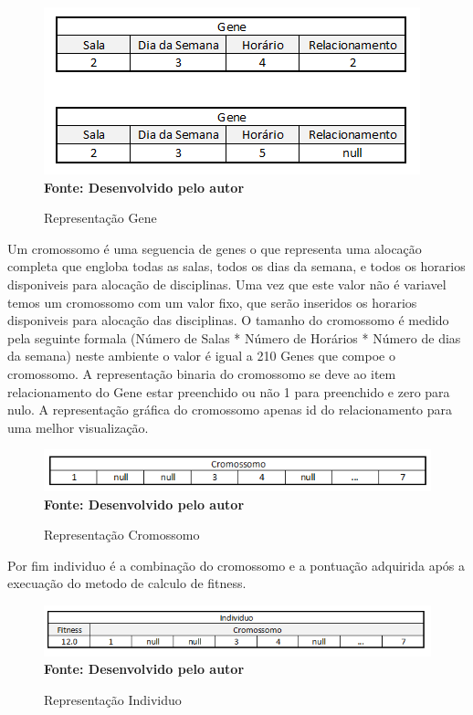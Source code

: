 \documentclass{abntpuc}
\begin{document}
\begin{figure}[!htb]
\caption[Representação Gene]{Representação Gene}
\label{fig:figura5}
\centering
\includegraphics[scale=0.7]{imagens/representacaoGene.png}
\\ \textbf{\footnotesize Fonte: Desenvolvido pelo autor}
\end{figure}

Um cromossomo é uma seguencia de genes o que representa uma alocação completa que engloba todas as salas, todos os dias da semana, e todos os horarios disponiveis para alocação de disciplinas. Uma vez que este valor não é variavel temos um cromossomo com um valor fixo, que serão inseridos os horarios disponiveis para alocação das disciplinas. O tamanho do cromossomo é medido pela seguinte formala (Número de Salas * Número de Horários * Número de dias da semana) neste ambiente o valor é igual a 210 Genes que compoe o cromossomo. A representação binaria do cromossomo se deve ao item relacionamento do Gene estar preenchido ou não 1 para preenchido e zero para nulo. A representação gráfica do cromossomo apenas id do relacionamento para uma melhor visualização.\par


\begin{figure}[!htb]
\caption[Representação Cromossomo]{Representação Cromossomo}
\label{fig:figura6}
\centering
\includegraphics[scale=0.8]{imagens/representacaoCromossomo.png}
\\ \textbf{\footnotesize Fonte: Desenvolvido pelo autor}
\end{figure}

Por fim individuo é a combinação do cromossomo e a pontuação adquirida após a execuação do metodo de calculo de fitness.\par

\begin{figure}[!htb]
\caption[Representação Individuo]{Representação Individuo}
\label{fig:figura7}
\centering
\includegraphics[scale=0.8]{imagens/representacaoIndividuo.png}
\\ \textbf{\footnotesize Fonte: Desenvolvido pelo autor}
\end{figure}
\end{document}
